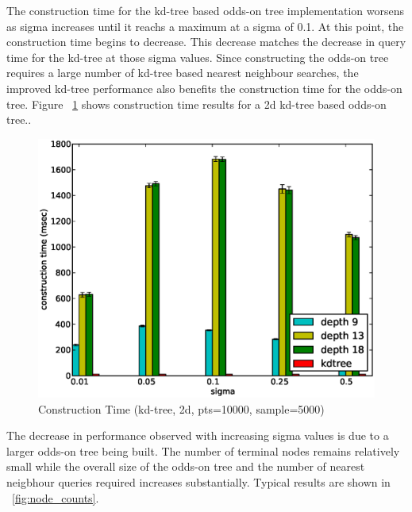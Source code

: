 \documentclass[mcs]{scsthesis}
\begin{document}
The construction time for the kd-tree based odds-on tree implementation worsens
as sigma increases until it reachs a maximum at a sigma of 0.1. At this point,
the construction time begins to decrease. This decrease matches the decrease
in query time for the kd-tree at those sigma values. Since constructing the
odds-on tree requires a large number of kd-tree based nearest neighbour
searches, the improved kd-tree performance also benefits the construction time
for the odds-on tree. Figure ~\ref{fig:sigma_ctime} shows construction time
results for a 2d kd-tree based odds-on tree..

\begin{figure}
\begin{center}
\includegraphics[scale=0.5]{diagrams/2d_pts10000_sample5000_ctime.eps}
\caption{Construction Time (kd-tree, 2d, pts=10000, sample=5000)}
\label{fig:sigma_ctime}
\end{center}
\end{figure}

The decrease in performance observed with increasing sigma values is due to
a larger odds-on tree being built. The number of terminal nodes remains
relatively small while the overall size of the odds-on tree and the number of
nearest neigbhour queries required increases substantially. Typical results are
shown in ~\ref{fig:node_counts}.
\end{document}
